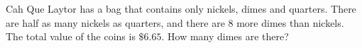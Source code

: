 Cah Que Laytor has a bag that contains only nickels, dimes and quarters. There are half as many nickels as quarters, and there are $8$ more dimes than nickels. The total value of the coins is $\$6.65$. How many dimes are there?
